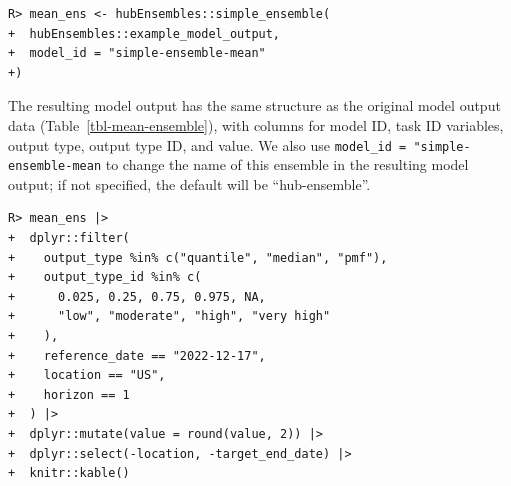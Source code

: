 \documentclass[
  article,
  shortnames,
  notitle]{jss}
\begin{document}
\begin{verbatim}
R> mean_ens <- hubEnsembles::simple_ensemble(
+  hubEnsembles::example_model_output,
+  model_id = "simple-ensemble-mean"
+)
\end{verbatim}

The resulting model output has the same structure as the original model
output data (Table~\ref{tbl-mean-ensemble}), with columns for model ID,
task ID variables, output type, output type ID, and value. We also use
\texttt{model\_id\ =\ "simple-ensemble-mean} to change the name of this
ensemble in the resulting model output; if not specified, the default
will be ``hub-ensemble''.

\begin{verbatim}
R> mean_ens |>
+  dplyr::filter(
+    output_type %in% c("quantile", "median", "pmf"),
+    output_type_id %in% c(
+      0.025, 0.25, 0.75, 0.975, NA,
+      "low", "moderate", "high", "very high"
+    ),
+    reference_date == "2022-12-17",
+    location == "US",
+    horizon == 1
+  ) |>
+  dplyr::mutate(value = round(value, 2)) |>
+  dplyr::select(-location, -target_end_date) |>
+  knitr::kable()
\end{verbatim}
\end{document}
